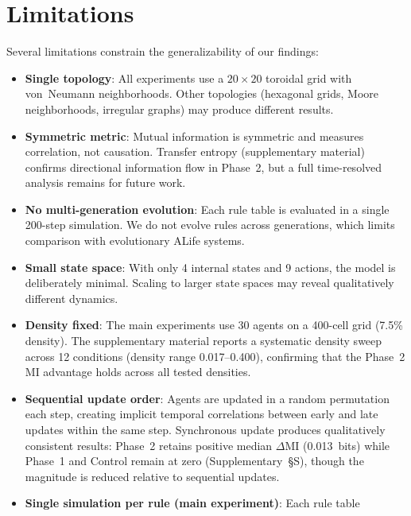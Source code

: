 \documentclass[letterpaper]{article}
\begin{document}
\section{Limitations}

Several limitations constrain the generalizability of our findings:

\begin{itemize}
  \item \textbf{Single topology}: All experiments use a $20 \times 20$ toroidal
        grid with von~Neumann neighborhoods. Other topologies (hexagonal grids,
        Moore neighborhoods, irregular graphs) may produce different results.
  \item \textbf{Symmetric metric}: Mutual information is symmetric and measures
        correlation, not causation. Transfer entropy (supplementary material)
        confirms directional information flow in Phase~2, but a full
        time-resolved analysis remains for future work.
  \item \textbf{No multi-generation evolution}: Each rule table is evaluated in
        a single 200-step simulation. We do not evolve rules across generations,
        which limits comparison with evolutionary ALife systems.
  \item \textbf{Small state space}: With only 4 internal states and 9 actions,
        the model is deliberately minimal. Scaling to larger state spaces may
        reveal qualitatively different dynamics.
  \item \textbf{Density fixed}: The main experiments use 30 agents on a
        400-cell grid (7.5\% density). The supplementary material
        reports a systematic density sweep across 12 conditions
        (density range 0.017--0.400), confirming that the Phase~2 MI
        advantage holds across all tested densities.
  \item \textbf{Sequential update order}: Agents are updated in a random
        permutation each step, creating implicit temporal correlations between
        early and late updates within the same step. Synchronous update produces qualitatively consistent results: Phase~2 retains positive median $\Delta\mathrm{MI}$ (0.013~bits) while Phase~1 and Control remain at zero (Supplementary~\S{}S), though the magnitude is reduced relative to sequential updates.
  \item \textbf{Single simulation per rule (main experiment)}: Each rule table

\end{itemize}
\end{document}
